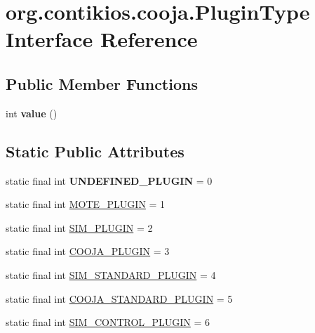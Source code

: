 \hypertarget{interfaceorg_1_1contikios_1_1cooja_1_1PluginType}{\section{org.\-contikios.\-cooja.\-Plugin\-Type Interface Reference}
\label{interfaceorg_1_1contikios_1_1cooja_1_1PluginType}
}
\subsection*{Public Member Functions}
\begin{DoxyCompactItemize}
\item 
\hypertarget{interfaceorg_1_1contikios_1_1cooja_1_1PluginType_a0ca87dbf266adc329339e5a329b63089}{int {\bfseries value} ()}\label{interfaceorg_1_1contikios_1_1cooja_1_1PluginType_a0ca87dbf266adc329339e5a329b63089}

\end{DoxyCompactItemize}
\subsection*{Static Public Attributes}
\begin{DoxyCompactItemize}
\item 
\hypertarget{interfaceorg_1_1contikios_1_1cooja_1_1PluginType_ace254ea00f71a7f3abf76d8bb23085e4}{static final int {\bfseries U\-N\-D\-E\-F\-I\-N\-E\-D\-\_\-\-P\-L\-U\-G\-I\-N} = 0}\label{interfaceorg_1_1contikios_1_1cooja_1_1PluginType_ace254ea00f71a7f3abf76d8bb23085e4}

\item 
static final int \hyperlink{interfaceorg_1_1contikios_1_1cooja_1_1PluginType_a0feea5aed2c626e527a69fb659439478}{M\-O\-T\-E\-\_\-\-P\-L\-U\-G\-I\-N} = 1
\item 
static final int \hyperlink{interfaceorg_1_1contikios_1_1cooja_1_1PluginType_a72817595223732361a60e932965ffc24}{S\-I\-M\-\_\-\-P\-L\-U\-G\-I\-N} = 2
\item 
static final int \hyperlink{interfaceorg_1_1contikios_1_1cooja_1_1PluginType_ab27aecee60e220de3c427952226e45f8}{C\-O\-O\-J\-A\-\_\-\-P\-L\-U\-G\-I\-N} = 3
\item 
static final int \hyperlink{interfaceorg_1_1contikios_1_1cooja_1_1PluginType_a69999eed1f73b6885fb9111da26599be}{S\-I\-M\-\_\-\-S\-T\-A\-N\-D\-A\-R\-D\-\_\-\-P\-L\-U\-G\-I\-N} = 4
\item 
static final int \hyperlink{interfaceorg_1_1contikios_1_1cooja_1_1PluginType_a19f9fbc0c23f33b5decbdf6076f7b872}{C\-O\-O\-J\-A\-\_\-\-S\-T\-A\-N\-D\-A\-R\-D\-\_\-\-P\-L\-U\-G\-I\-N} = 5
\item 
static final int \hyperlink{interfaceorg_1_1contikios_1_1cooja_1_1PluginType_ae155ed8fa9ace82527925b010b33813e}{S\-I\-M\-\_\-\-C\-O\-N\-T\-R\-O\-L\-\_\-\-P\-L\-U\-G\-I\-N} = 6
\end{DoxyCompactItemize}



